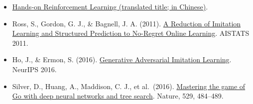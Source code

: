 \vspace{0.25em}
\begin{itemize}
\tightlist
\item
  \href{https://hrl.boyuai.com/}{Hands-on Reinforcement Learning (translated title; in Chinese)}.
\item
  Ross, S., Gordon, G. J., \& Bagnell, J. A. (2011). \href{https://proceedings.mlr.press/v15/ross11a.html}{A Reduction of Imitation Learning and Structured Prediction to No-Regret Online Learning}. AISTATS 2011.
\item
  Ho, J., \& Ermon, S. (2016). \href{https://arxiv.org/abs/1606.03476}{Generative Adversarial Imitation Learning}. NeurIPS 2016.
\item
  Silver, D., Huang, A., Maddison, C. J., et al.~(2016). \href{https://doi.org/10.1038/nature16961}{Mastering the game of Go with deep neural networks and tree search}. Nature, 529, 484--489.
\end{itemize}

\clearpage
